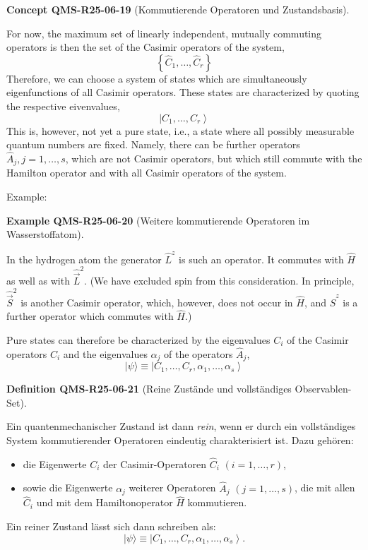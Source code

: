 \documentclass[10pt, letterpaper]{article}
\newcommand{\CustomHeading}[3]{%
  \par\medskip\noindent%
  \textbf{#1 #2} \textnormal{(#3)}.\enskip%
}
\newenvironment{DEF}[2]{\begin{unitbox}\CustomHeading{Definition}{#1}{#2}}{\end{unitbox}}
\newenvironment{EXA}[2]{\begin{unitbox}\CustomHeading{Example}{#1}{#2}}{\end{unitbox}}
\newenvironment{CONC}[2]{\begin{unitbox}\CustomHeading{Concept}{#1}{#2}}{\end{unitbox}}
\begin{document}
\begin{CONC}{QMS-R25-06-19}{Kommutierende Operatoren und Zustandsbasis}
For now, the maximum set of linearly independent, mutually commuting operators is then the set of the Casimir operators of the system,
$$
\left\{\hat{C}_{1}, \ldots, \hat{C}_{r}\right\}
$$
Therefore, we can choose a system of states which are simultaneously eigenfunctions of all Casimir operators. These states are characterized by quoting the respective eivenvalues,
$$
\left|C_{1}, \ldots, C_{r}\right\rangle
$$
This is, however, not yet a pure state, i.e., a state where all possibly measurable quantum numbers are fixed. Namely, there can be further operators $\hat{A}_{j}, j=1, \ldots, s$, which are not Casimir operators, but which still commute with the Hamilton operator and with all Casimir operators of the system.
\end{CONC}



Example: 


\begin{EXA}{QMS-R25-06-20}{Weitere kommutierende Operatoren im Wasserstoffatom}
In the hydrogen atom the generator $\hat{L}^{z}$ is such an operator. It commutes with $\hat{H}$ as well as with $\hat{\vec{L}}^{2}$. (We have excluded spin from this consideration. In principle, $\hat{\vec{S}}^{2}$ is another Casimir operator, which, however, does not occur in $\hat{H}$, and $\hat{S}^{z}$ is a further operator which commutes with $\hat{H}$.)
\end{EXA}



Pure states can therefore be characterized by the eigenvalues $C_{i}$ of the Casimir operators $\hat{C}_{i}$ and the eigenvalues $\alpha_{j}$ of the operators $\hat{A}_{j}$,
$$
|\psi\rangle \equiv\left|C_{1}, \ldots, C_{r}, \alpha_{1}, \ldots, \alpha_{s}\right\rangle
$$


\begin{DEF}{QMS-R25-06-21}{Reine Zustände und vollständiges Observablen-Set}
Ein quantenmechanischer Zustand ist dann \textit{rein}, wenn er durch ein vollständiges System kommutierender Operatoren eindeutig charakterisiert ist. Dazu gehören:
\begin{itemize}
  \item die Eigenwerte $C_i$ der Casimir-Operatoren $\hat{C}_i$ $(i = 1, \dots, r)$,
  \item sowie die Eigenwerte $\alpha_j$ weiterer Operatoren $\hat{A}_j$ $(j = 1, \dots, s)$, die mit allen $\hat{C}_i$ und mit dem Hamiltonoperator $\hat{H}$ kommutieren.
\end{itemize}
Ein reiner Zustand lässt sich dann schreiben als:
\[
|\psi\rangle \equiv \left|C_{1}, \ldots, C_{r}, \alpha_{1}, \ldots, \alpha_{s}\right\rangle.
\]
\end{DEF}
\end{document}
